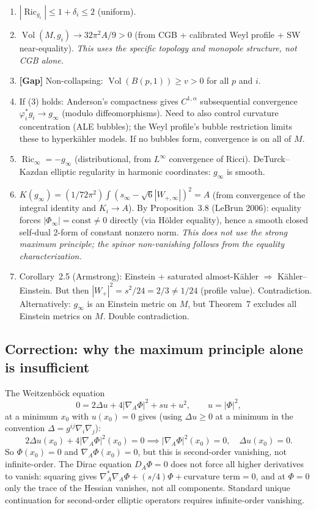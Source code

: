\begin{enumerate}
\item \(|\operatorname{Ric}_{g_i}|\le1+\delta_i\le2\) (uniform).
\item \(\operatorname{Vol}(M,g_i)\to32\pi^2A/9>0\) (from CGB + calibrated
  Weyl profile + SW near-equality).
  \emph{This uses the specific topology and monopole structure, not CGB alone.}
\item \textbf{[Gap]} Non-collapsing: \(\operatorname{Vol}(B(p,1))\ge v>0\)
  for all \(p\) and \(i\).
\item If (3) holds: Anderson's compactness gives \(C^{1,\alpha}\)
  subsequential convergence \(\varphi_i^*g_i\to g_\infty\)
  (modulo diffeomorphisms).  Need to also control curvature concentration
  (ALE bubbles); the Weyl profile's bubble restriction limits these to
  hyperk\"ahler models.  If no bubbles form, convergence is on all of \(M\).
\item \(\operatorname{Ric}_\infty=-g_\infty\) (distributional, from
  \(L^\infty\) convergence of Ricci).  DeTurck--Kazdan elliptic regularity
  in harmonic coordinates: \(g_\infty\) is smooth.
\item \(K(g_\infty)=(1/72\pi^2)\int(s_\infty-\sqrt6|W_{+,\infty}|)^2=A\)
  (from convergence of the integral identity and \(K_i\to A\)).
  By Proposition~3.8 (LeBrun 2006): equality forces
  \(|\Phi_\infty|=\text{const}\ne0\) directly (via H\"older equality),
  hence a smooth closed self-dual 2-form of constant nonzero norm.
  \emph{This does not use the strong maximum principle; the spinor
  non-vanishing follows from the equality characterization.}
\item Corollary~2.5 (Armstrong): Einstein + saturated almost-K\"ahler
  \(\Rightarrow\) K\"ahler--Einstein.  But then
  \(|W_+|^2=s^2/24=2/3\ne1/24\) (profile value).  Contradiction.
  Alternatively: \(g_\infty\) is an Einstein metric on \(M\), but
  Theorem~7 excludes all Einstein metrics on \(M\).  Double contradiction.
\end{enumerate}

\subsection{Correction: why the maximum principle alone is insufficient}

The Weitzenb\"ock equation
\[
  0=2\Delta u+4|\nabla_A\Phi|^2+su+u^2,\qquad u=|\Phi|^2,
\]
at a minimum \(x_0\) with \(u(x_0)=0\) gives (using \(\Delta u\ge0\)
at a minimum in the convention \(\Delta=g^{ij}\nabla_i\nabla_j\)):
\[
  2\Delta u(x_0)+4|\nabla_A\Phi|^2(x_0)=0
  \implies|\nabla_A\Phi|^2(x_0)=0,\quad\Delta u(x_0)=0.
\]
So \(\Phi(x_0)=0\) and \(\nabla_A\Phi(x_0)=0\), but this is second-order
vanishing, not infinite-order.  The Dirac equation \(D_A\Phi=0\) does not
force all higher derivatives to vanish: squaring gives
\(\nabla_A^*\nabla_A\Phi+(s/4)\Phi+\text{curvature term}=0\),
and at \(\Phi=0\) only the trace of the Hessian vanishes, not all components.
Standard unique continuation for second-order elliptic operators requires
infinite-order vanishing.

